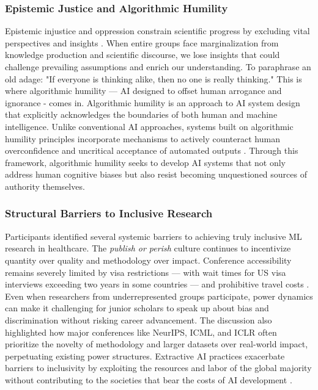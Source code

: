 \subsubsection{Epistemic Justice and Algorithmic Humility}
Epistemic injustice and oppression constrain scientific progress by excluding vital perspectives and insights \citep{dotson_conceptualizing_2014, fricker_epistemic_2007, kay_epistemic_2024}. When entire groups face marginalization from knowledge production and scientific discourse, we lose insights that could challenge prevailing assumptions and enrich our understanding. To paraphrase an old adage: "If everyone is thinking alike, then no one is really thinking." This is where algorithmic humility — AI designed to offset human arrogance and ignorance - comes in. Algorithmic humility is an approach to AI system design that explicitly acknowledges the boundaries of both human and machine intelligence. Unlike conventional AI approaches, systems built on algorithmic humility principles incorporate mechanisms to actively counteract human overconfidence and uncritical acceptance of automated outputs \citep{kompa_second_2021}. Through this framework, algorithmic humility seeks to develop AI systems that not only address human cognitive biases but also resist becoming unquestioned sources of authority themselves.

\subsubsection{Structural Barriers to Inclusive Research}
Participants identified several systemic barriers to achieving truly inclusive ML research in healthcare. The \textit{publish or perish} culture continues to incentivize quantity over quality and methodology over impact. Conference accessibility remains severely limited by visa restrictions — with wait times for US visa interviews exceeding two years in some countries — and prohibitive travel costs \citep{hutson_canada_2018, owusu-gyamfi_exhausted_2024, thompson_canadian_2024}. Even when researchers from underrepresented groups participate, power dynamics can make it challenging for junior scholars to speak up about bias and discrimination without risking career advancement. The discussion also highlighted how major conferences like NeurIPS, ICML, and ICLR often prioritize the novelty of methodology and larger datasets over real-world impact, perpetuating existing power structures. Extractive AI practices exacerbate barriers to inclusivity by exploiting the resources and labor of the global majority without contributing to the societies that bear the costs of AI development \citep{crawford_atlas_2021, li_making_2023, luccioni_power_2024}.

